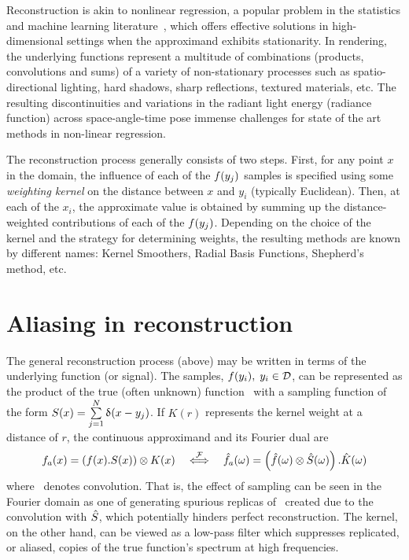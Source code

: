 \documentclass[11pt,fleqn]{book} %
\begin{document}
Reconstruction is akin to nonlinear regression, a popular problem in the statistics and machine learning literature~\cite{MLTextBook}, which offers effective solutions in high-dimensional settings when the approximand exhibits stationarity. In rendering, the underlying functions represent a multitude of combinations (products, convolutions and sums) of a variety of non-stationary processes such as spatio-directional lighting, hard shadows, sharp reflections, textured materials, etc. The resulting discontinuities and variations in the radiant light energy (radiance function) across space-angle-time pose immense challenges for state of the art methods in non-linear regression.

The reconstruction process generally consists of two steps. First, for any point $x$ in the domain, the influence of each of the $f(y_j)$ samples is specified using some \textit{weighting kernel} on the distance between $x$ and $y_i$ (typically Euclidean). Then, at each of the $x_i$, the approximate value is obtained by summing up the distance-weighted contributions of each of the $f(y_j)$. Depending on the choice of the kernel and the strategy for determining weights, the resulting methods are known by different names: Kernel Smoothers, Radial Basis Functions, Shepherd's method, etc.  

\section{Aliasing in reconstruction}
The general reconstruction process (above) may be written in terms of the underlying function (or signal). The samples, $f(y_i), \; y_i \in \mathcal{D}$, can be represented as the  product of the true (often unknown) function \ifn\ with a sampling function of the form $S(x) = \sum\limits_{j=1}^{N} \updelta(x-y_j)$. 
If $K(r)$ represents the kernel weight at a distance of $r$, the continuous approximand and its Fourier dual are
\begin{equation} \label{eq:recons}
 {\ensuremath{f}}_a(x) = \left(f(x) . S(x) \right) \otimes K(x) \quad \overset{\mathcal{F}}{\Longleftrightarrow}\quad  
 {\ensuremath{\hat{f}}}_a(\omega) = \left(\hat{f}(\omega) \otimes \hat{S}(\omega)\right) . \hat{K}(\omega) 
\end{equation}
where \conv\ denotes convolution. That is, the effect of sampling can be seen in the Fourier domain as one of generating spurious replicas of \IFsym\, created due to the convolution with $\hat{S}$, which potentially hinders perfect reconstruction.   The kernel, on the other hand, can be viewed as a low-pass filter which suppresses replicated, or aliased, copies of the true function's spectrum at high frequencies. 
\end{document}
